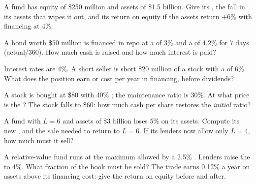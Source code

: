 \begin{exercise}[$\star$]\label{exo:m1:financing:1}
A fund has equity of \$250 million and assets of \$1.5 billion. Give its
, the fall in its assets that wipes it out, and its return on equity
if the assets return $+6\%$ with financing at 4\%.
\end{exercise}

\begin{exercise}[$\star$]\label{exo:m1:financing:2}
A bond worth \$50 million is financed in repo at a  of 3\% and a  of 4.2\% for 7 days (actual/360). How much cash is raised and how much
interest is paid?
\end{exercise}

\begin{exercise}[$\star$]\label{exo:m1:financing:3}
Interest rates are 4\%. A short seller is short \$20 million of a stock with
a  of 6\%. What does the position earn or cost per year in
financing, before dividends?
\end{exercise}

\begin{exercise}[$\star\star$]\label{exo:m1:financing:4}
A stock is bought at \$80 with 40\% ; the maintenance ratio is
30\%. At what price is the ? The stock falls to \$60: how much
cash per share restores the \emph{initial} ratio?
\end{exercise}

\begin{exercise}[$\star\star$]\label{exo:m1:financing:5}
A fund with $L = 6$ and assets of \$3 billion loses 5\% on its assets.
Compute its new , and the sale needed to return to $L = 6$. If its
lenders now allow only $L = 4$, how much must it sell?
\end{exercise}

\begin{exercise}[$\star\star$]\label{exo:m1:financing:6}
A relative-value fund runs at the maximum  allowed by a 2.5\%
. Lenders raise the  to 4\%. What fraction of the book must be
sold? The trade earns 0.12\% a year on assets above its financing cost:
give the return on equity before and after.
\end{exercise}


